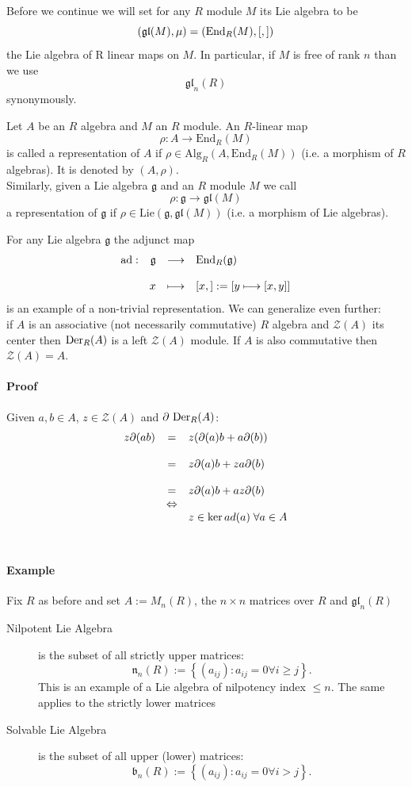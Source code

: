 Before we continue we will set for any $R$ module $M$ its Lie algebra to be $$(\mathfrak{gl}(M),\mu) = (\rendo{M}, [,])$$
the Lie algebra of R linear maps on $M$. In particular, if $M$ is free of rank $n$ than we use
$$\mathfrak{gl}_n(R)$$
synonymously.
\begin{defi}
Let $A$ be an $R$ algebra and $M$ an $R$ module. An $R$-linear map
$$\rho : A \longrightarrow \mathrm{End}_R(M)$$
is called a representation of $A$ if $\rho \in \mathrm{Alg}_R(A,\mathrm{End}_R(M))$ (i.e. a morphism of $R$ algebras). It is denoted by $(A,\rho)$.\\
Similarly, given a Lie algebra $\mathfrak{g}$ and an $R$ module $M$
we call
$$\rho : \mathfrak{g} \longrightarrow \mathfrak{gl}(M)$$
a representation of $\mathfrak{g}$ if $\rho \in \mathrm{Lie}(\mathfrak{g},\mathfrak{gl}(M))$ (i.e. a morphism of Lie algebras).
\end{defi}
For any Lie algebra $\mathfrak{g}$ the adjunct map
$$\bao{rrcl}
\mathrm{ad} : &\mathfrak{g}& \longrightarrow& \mathrm{End}_R(\mathfrak{g})
\\
\\
& x &\longmapsto& [x,] := [y \longmapsto [x,y]]
\ea$$
is an example of a non-trivial representation. 
\bmk We can generalize even further:\\
if $A$ is an associative (not necessarily commutative) $R$ algebra and $\mathcal{Z}(A)$ its center then 
$\dera$ is a left $\mathcal{Z}(A)$ module. If $A$ is also commutative then $\mathcal{Z}(A) = A$.
\paragraph{Proof} Given $a, b \in A$, $z \in \mathcal{Z}(A)$ and $\partial \ \dera$:
$$\bao{rcl}
z \partial (a b) &=& z (\partial(a) b + a \partial(b))\\
&&\\
&=& z \partial(a) b + z a \partial(b)\\
&&\\
&=& z \partial(a) b + a z \partial(b)\\
&\Leftrightarrow&\\
& & z \in \ker ad (a)\;\forall a \in A\\
\ea$$
~\\
\paragraph{Example} Fix $R$ as before and set $A := M_n(R)$, the $n \times n$ matrices over $R$ and $\mathfrak{gl}_n(R)$
\begin{description}
\item[Nilpotent Lie Algebra] is the subset of all strictly upper matrices:
$$\mathfrak{n}_n(R) := \left\{\left(a_{ij}\right) : a_{ij} = 0 \forall i \geq j\right\}.$$
This is an example of a Lie algebra of nilpotency index $\leq n$. The same applies to the strictly lower matrices 
\item[Solvable Lie Algebra] is the subset of all upper (lower) matrices:
$$\mathfrak{b}_n(R) := \left\{\left(a_{ij}\right) : a_{ij} = 0 \forall i > j\right\}.$$
\end{description}

